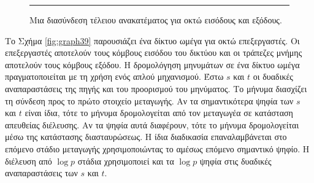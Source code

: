 \documentclass[12pt,a4paper]{article}
\begin{document}
\begin{figure}[H]
\centering
{}
\noindent\rule{\textwidth}{0.2pt}
\caption{Μια διασύνδεση τέλειου ανακατέματος
για οκτώ εισόδους και εξόδους.}
\label{fig:graph37}
\end{figure}
\vspace{0.3cm}

Το Σχήμα \ref{fig:graph39} παρουσιάζει ένα δίκτυο ωμέγα
για οκτώ επεξεργαστές. Οι επεξεργαστές αποτελούν τους κόμβους εισόδου 
του δικτύου και οι τράπεζες μνήμης αποτελούν τους κόμβους εξόδου. 
Η δρομολόγηση μηνυμάτων σε ένα δίκτυο ωμέγα πραγματοποιείται με τη χρήση 
ενός απλού μηχανισμού. Έστω $s$ και $t$ οι δυαδικές αναπαραστάσεις της 
πηγής και του προορισμού του μηνύματος. Το μήνυμα διασχίζει τη σύνδεση 
προς το πρώτο στοιχείο μεταγωγής. 
Αν τα σημαντικότερα ψηφία των $s$ και $t$ είναι ίδια, τότε το μήνυμα 
δρομολογείται από τον μεταγωγέα σε κατάσταση απευθείας διέλευσης. Αν τα 
ψηφία αυτά διαφέρουν, τότε το μήνυμα δρομολογείται μέσω της κατάστασης 
διασταυρώσεως. Η ίδια διαδικασία επαναλαμβάνεται στο επόμενο στάδιο 
μεταγωγής χρησιμοποιώντας το αμέσως επόμενο σημαντικό ψηφίο. Η διέλευση 
από $\log p$ στάδια χρησιμοποιεί και τα $\log p$ ψηφία στις δυαδικές 
αναπαραστάσεις των $s$ και $t$.
\end{document}
